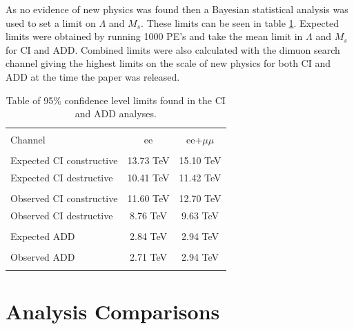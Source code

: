	As no evidence of new physics was found then a Bayesian statistical analysis was used to set a limit on $\Lambda$ and $M_{s}$. These limits can be seen in table \ref{tab:Limits7}. Expected limits were obtained by running 1000 PE's and take the mean limit in $\Lambda$ and $M_{s}$ for CI and ADD. Combined limits were also calculated with the dimuon search channel giving the highest limits on the scale of new physics for both CI and ADD at the time the paper was released.


	\begin{table}[h!]
	\centering %
	\begin{tabular}{l cc} %
	\hline\hline \\[-2ex] %
	Channel & ee & ee+$\mu\mu$\\  [0.2ex]
	\hline  \\[-2ex] %
	Expected CI constructive & 13.73 TeV & 15.10 TeV\\ 
	Expected CI destructive & 10.41 TeV & 11.42 TeV \\ 
	\hline  \\[-2ex] %
	Observed CI constructive & 11.60 TeV & 12.70 TeV \\ 
	Observed CI destructive & 8.76 TeV & 9.63 TeV \\ 
	\hline\hline  \\[-2ex] %
	Expected ADD & 2.84 TeV & 2.94 TeV \\ 
	\hline  \\[-2ex] %
	Observed ADD & 2.71 TeV & 2.94 TeV \\ 
	\hline\hline  \\ %
	\end{tabular}
	\caption{Table of 95\% confidence level limits found in the CI and ADD analyses.} %
	\label{tab:Limits7}
	\end{table}




\section{Analysis Comparisons}



